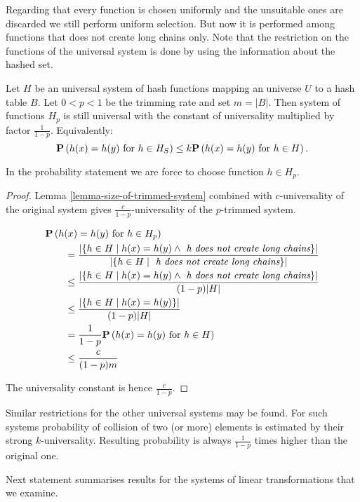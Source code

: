 Regarding that every function is chosen uniformly and the unsuitable ones are discarded we still perform uniform selection. But now it is performed among functions that does not create long chains only. Note that the restriction on the functions of the universal system is done by using the information about the hashed set.

\begin{theorem}
Let $H$ be an universal system of hash functions mapping an universe $U$ to a hash table $B$. Let $0 < p < 1$ be the trimming rate and set $m = |B|$. Then system of functions $H_p$ is still universal with the constant of universality multiplied by factor $\frac{1}{1 - p}$. Equivalently:
\[
	\mathbf{P}\left(h(x) = h(y) \text{ for } h \in H_S\right) \leq k \mathbf{P}\left(h(x) = h(y) \text{ for } h \in H\right) \text{.}
\]
\end{theorem}
In the probability statement we are force to choose function $h \in H_p$.
\begin{proof}
Lemma \ref{lemma-size-of-trimmed-system} combined with $c$-universality of the original system gives $\frac{c}{1 - p}$-universality of the $p$-trimmed system. 

\[
\begin{split}
& \mathbf{P}\left(h(x) = h(y) \text{ for } h \in H_p\right)  \\
	& \qquad =  \frac{|\{ h \in H \mid h(x) = h(y) \wedge \textit{ h does not create long chains} \}|}{|\lbrace h \in H \mid \textit{ h does not create long chains} \rbrace|} \\
	& \qquad \leq \frac{|\{ h \in H \mid h(x) = h(y) \wedge \textit{ h does not create long chains} \}|}{(1 - p)|H|} \\ 
	& \qquad \leq \frac{|\{ h \in H \mid h(x) = h(y) \}|}{(1 - p)|H|} \\
	& \qquad = \frac{1}{1 - p} \mathbf{P}\left(h(x) = h(y) \text{ for } h \in H\right) \\
	& \qquad \leq \frac{c}{(1 - p) m} \\
\end{split}
\]

The universality constant is hence $\frac{c}{1 - p}$.
\end{proof}

Similar restrictions for the other universal systems may be found. For such systems probability of collision of two (or more) elements is estimated by their strong $k$-universality. Resulting probability is always $\frac{1}{1 - p}$ times higher than the original one.

Next statement summarises results for the systems of linear transformations that we examine.

